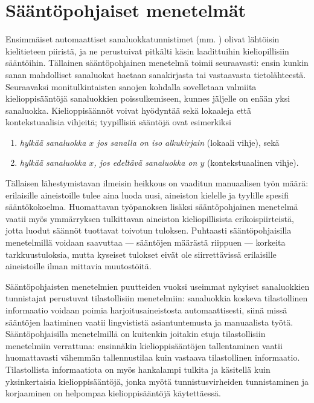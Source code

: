 \documentclass[utf8,bachelor,manualbib]{gradu3}
\begin{document}
\chapter{Sääntöpohjaiset menetelmät}

Ensimmäiset automaattiset sanaluokkatunnistimet (mm. \citealp{greene1971}) olivat lähtöisin kielitieteen piiristä, ja ne perustuivat pitkälti käsin laadittuihin kieliopillisiin sääntöihin. Tällainen sääntöpohjainen menetelmä toimii seuraavasti: ensin kunkin sanan mahdolliset sanaluokat haetaan sanakirjasta tai vastaavasta tietolähteestä. Seuraavaksi monitulkintaisten sanojen kohdalla sovelletaan valmiita kielioppisääntöjä sanaluokkien poissulkemiseen, kunnes jäljelle on enään yksi sanaluokka. Kielioppisäännöt voivat hyödyntää sekä lokaaleja että kontekstuaalisia vihjeitä; tyypillisiä sääntöjä ovat esimerkiksi

\begin{enumerate}
\item \textit{hylkää sanaluokka $x$ jos sanalla on iso alkukirjain} (lokaali vihje), sekä
\item \textit{hylkää sanaluokka $x$, jos edeltävä sanaluokka on $y$} (kontekstuaalinen vihje).
\end{enumerate}

Tällaisen lähestymistavan ilmeisin heikkous on vaaditun manuaalisen työn määrä: erilaisille aineistoille tulee aina luoda uusi, aineiston kielelle ja tyylille spesifi sääntökokoelma. Huomattavan työpanoksen lisäksi sääntöpohjainen menetelmä vaatii myös ymmärryksen tulkittavan aineiston kieliopillisista erikoispiirteistä, jotta luodut säännöt tuottavat toivotun tuloksen. Puhtaasti sääntöpohjaisilla menetelmillä voidaan saavuttaa --- sääntöjen määrästä riippuen --- korkeita tarkkuustuloksia, mutta kyseiset tulokset eivät ole siirrettävissä erilaisille aineistoille ilman mittavia muutostöitä.

Sääntöpohjaisten menetelmien puutteiden vuoksi useimmat nykyiset sanaluokkien tunnistajat perustuvat tilastollisiin menetelmiin: sanaluokkia koskeva tilastollinen informaatio voidaan poimia harjoitusaineistosta automaattisesti, siinä missä sääntöjen laatiminen vaatii lingvististä asiantuntemusta ja manuaalista työtä. Sääntöpohjaisilla menetelmillä on kuitenkin joitakin etuja tilastollisiin menetelmiin verrattuna: ensinnäkin kielioppisääntöjen tallentaminen vaatii huomattavasti vähemmän tallennustilaa kuin vastaava tilastollinen informaatio. Tilastollista informaatiota on myös hankalampi tulkita ja käsitellä kuin yksinkertaisia kielioppisääntöjä, jonka myötä tunnistusvirheiden tunnistaminen ja korjaaminen on helpompaa kielioppisääntöjä käytettäessä. \citep{brill1992}
\end{document}
